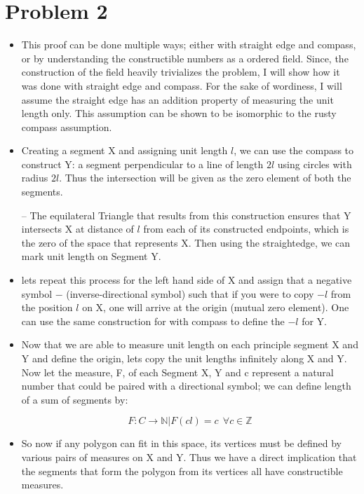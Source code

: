 \documentclass[]{report}
\begin{document}
	
	
\section{Problem 2}
	
	
\begin{itemize}
	\item This proof can be done multiple ways; either with straight edge and compass, or by understanding the constructible numbers as a ordered field.  Since, the construction of the field heavily trivializes the problem, I will show how it was done with straight edge and compass. For the sake of wordiness, I will assume the straight edge has an addition property of measuring the unit length only.  This assumption can be shown to be isomorphic to the rusty compass assumption.
		
	\item Creating a segment X and assigning unit length $l$, we can use the compass to construct Y:  a segment perpendicular to a line of length $2l$ using circles with radius  $2l$.  Thus the intersection will be  given as the zero element of both the segments. 
	
	\subitem-- The equilateral Triangle that results from this construction ensures that Y intersects X at  distance of $l$ from each of its constructed endpoints, which is the zero of the space that represents X.  Then using the straightedge, we can mark unit length on Segment Y.
	
	\item lets repeat this process for the left hand side of X and assign that a negative symbol $-$ (inverse-directional symbol) such that if you were to copy $-l$ from the position $l$  on X, one will arrive at the origin (mutual zero element). One can use the same construction for with compass to define the $-l$ for Y.
	
	
	\item Now that we are able to measure unit length on each principle segment X and Y and define the origin, lets copy the unit lengths infinitely along X and Y.   Now let the measure, F,  of each Segment X, Y and c represent a natural number that could be paired with a  directional symbol; we can define length of a sum of segments by:
	
	$$ F: C \to \mathbb{N} | F(c l ) = c \ \ \forall c \in \mathbb{Z} $$
		
	\item So now if any polygon can fit in this space, its vertices must be defined by various pairs of measures on X and Y. Thus we have a direct implication that the segments that form the polygon from its vertices all have constructible measures.
	

\end{itemize}
\end{document}
